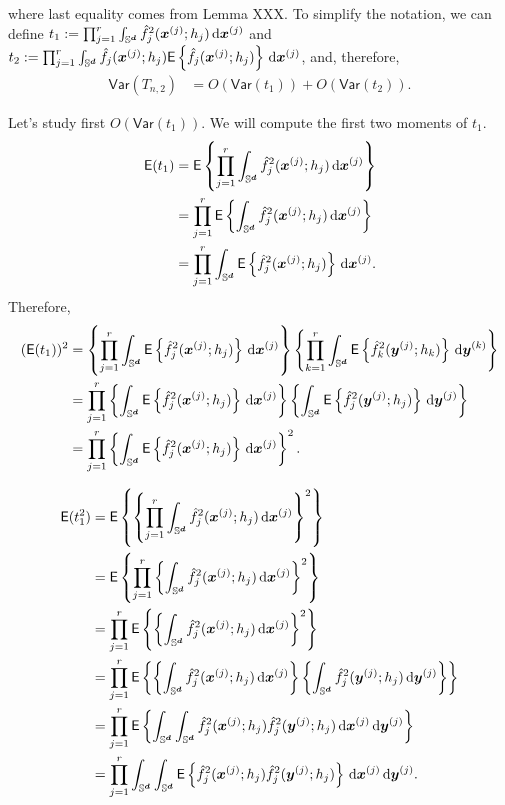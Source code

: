 \documentclass{article}
\begin{document}
where last equality comes from Lemma XXX. To simplify the notation, we can define $t_1 \defin \prod_{j=1}^{r} \int_{\Sr} \hat{f}_{j}^2(\bx^{(j)};h_j) \,\rd \bx^{(j)}$ and $t_2 \defin \prod_{j=1}^{r} \int_{\Sr} \hat{f}_{j}(\bx^{(j)};h_j) \mathsf{E} \lrb{ \hat{f}_{j}(\bx^{(j)};h_j)}  \,\rd \bx^{(j)}$, and, therefore,
\begin{align*}
    \mathsf{Var}(T_{n,2}) &= O(\mathsf{Var} (t_1)) + O(\mathsf{Var} (t_2)).
\end{align*}

Let's study first $O(\mathsf{Var} (t_1))$. We will compute the first two moments of $t_1$.
\begin{align*}
    \mathsf{E} (t_1) &= \mathsf{E} \lrb{\prod_{j=1}^{r} \int_{\Sr} \hat{f}_{j}^2(\bx^{(j)};h_j) \,\rd \bx^{(j)}} \\
    &= \prod_{j=1}^{r} \mathsf{E} \lrb{ \int_{\Sr} \hat{f}_{j}^2(\bx^{(j)};h_j) \,\rd \bx^{(j)}} \\
    &= \prod_{j=1}^{r} \int_{\Sr} \mathsf{E} \lrb{ \hat{f}_{j}^2(\bx^{(j)};h_j)} \,\rd \bx^{(j)}. \\
\end{align*}
Therefore,
\begin{align*}
    (\mathsf{E} (t_1))^2 &= \lrb{\prod_{j=1}^{r} \int_{\Sr} \mathsf{E} \lrb{ \hat{f}_{j}^2(\bx^{(j)};h_j)} \,\rd \bx^{(j)}} \lrb{\prod_{k=1}^{r} \int_{\Sr} \mathsf{E} \lrb{ \hat{f}_{k}^2(\by^{(j)};h_k)} \,\rd \by^{(k)}} \\
    &= \prod_{j=1}^{r} \lrb{\int_{\Sr} \mathsf{E} \lrb{ \hat{f}_{j}^2(\bx^{(j)};h_j)} \,\rd \bx^{(j)}} \lrb{\int_{\Sr} \mathsf{E} \lrb{ \hat{f}_{j}^2(\by^{(j)};h_j)} \,\rd \by^{(j)}} \\
     &= \prod_{j=1}^{r} \lrb{\int_{\Sr} \mathsf{E} \lrb{ \hat{f}_{j}^2(\bx^{(j)};h_j)} \,\rd \bx^{(j)}}^2.
\end{align*}

\begin{align*}
    \mathsf{E} (t_1^2) &= \mathsf{E} \lrb{ \lrb{\prod_{j=1}^{r} \int_{\Sr} \hat{f}_{j}^2(\bx^{(j)};h_j) \,\rd \bx^{(j)}}^2 }\\
    &= \mathsf{E} \lrb{ \prod_{j=1}^{r} \lrb{ \int_{\Sr} \hat{f}_{j}^2(\bx^{(j)};h_j) \,\rd \bx^{(j)}}^2 }\\
    &= \prod_{j=1}^{r} \mathsf{E} \lrb{ \lrb{ \int_{\Sr} \hat{f}_{j}^2(\bx^{(j)};h_j) \,\rd \bx^{(j)}}^2 }\\
    &= \prod_{j=1}^{r} \mathsf{E} \lrb{ \lrb{ \int_{\Sr} \hat{f}_{j}^2(\bx^{(j)};h_j) \,\rd \bx^{(j)}} \lrb{ \int_{\Sr} \hat{f}_{j}^2(\by^{(j)};h_j) \,\rd \by^{(j)}} }\\
    &= \prod_{j=1}^{r} \mathsf{E} \lrb{  \int_{\Sr} \int_{\Sr} \hat{f}_{j}^2(\bx^{(j)};h_j) \hat{f}_{j}^2(\by^{(j)};h_j) \,\rd \bx^{(j)} \,\rd \by^{(j)} }\\
    &= \prod_{j=1}^{r} \int_{\Sr} \int_{\Sr} \mathsf{E} \lrb{ \hat{f}_{j}^2(\bx^{(j)};h_j) \hat{f}_{j}^2(\by^{(j)};h_j) } \,\rd \bx^{(j)} \,\rd \by^{(j)}. \\
\end{align*}
\end{document}
